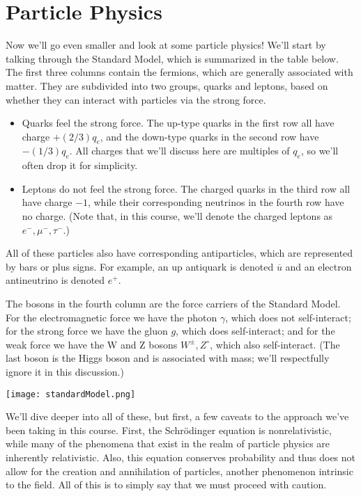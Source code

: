 \documentclass[../p052main.tex]{subfiles}
\begin{document}
\section{Particle Physics}%
Now we'll go even smaller and look at some particle physics!
We'll start by talking through the Standard Model, which is summarized in the table below.
The first three columns contain the fermions, which are generally associated with matter.
They are subdivided into two groups, quarks and leptons, based on whether they can interact with particles via the strong force.
\begin{itemize}
    \item Quarks feel the strong force.
    The up-type quarks in the first row all have charge $+(2 / 3)q_e$, and the down-type quarks in the second row have $-(1 / 3)q_e$.
    All charges that we'll discuss here are multiples of $q_e$, so we'll often drop it for simplicity.

    \item Leptons do not feel the strong force.
    The charged quarks in the third row all have charge $-1$, while their corresponding neutrinos in the fourth row have no charge.
    (Note that, in this course, we'll denote the charged leptons as $e^-, \mu^-, \tau^-$.)
\end{itemize}
All of these particles also have corresponding antiparticles, which are represented by bars or plus signs.
For example, an up antiquark is denoted $\overline{u}$ and an electron antineutrino is denoted $e^+$.

The bosons in the fourth column are the force carriers of the Standard Model.
For the electromagnetic force we have the photon $\gamma$, which does not self-interact; for the strong force we have the gluon $g$, which does self-interact; and for the weak force we have the W and Z bosons $W^\pm, Z^\circ$, which also self-interact.
(The last boson is the Higgs boson and is associated with mass; we'll respectfully ignore it in this discussion.)

\begin{center}
    \texttt{[image: standardModel.png]}
\end{center}

We'll dive deeper into all of these, but first, a few caveats to the approach we've been taking in this course.
First, the Schrödinger equation is nonrelativistic, while many of the phenomena that exist in the realm of particle physics are inherently relativistic.
Also, this equation conserves probability and thus does not allow for the creation and annihilation of particles, another phenomenon intrinsic to the field.
All of this is to simply say that we must proceed with caution.
\end{document}

